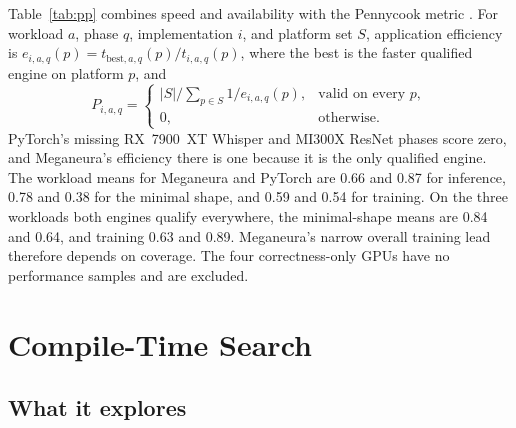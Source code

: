 \documentclass[conference]{IEEEtran}
\newcommand{\system}{Meganeura}
\begin{document}
\begin{table}[t]
\caption{Pennycook scores over the seven main platforms, strict contract.
M: \system{}, P: PyTorch.}
\label{tab:pp}
\centering
\footnotesize
\setlength{\tabcolsep}{4pt}

\end{table}

Table~\ref{tab:pp} combines speed and availability with the Pennycook metric
\cite{pennycook2016metric,pennycook2021revisiting}. For workload $a$, phase
$q$, implementation $i$, and platform set $S$, application efficiency is
$e_{i,a,q}(p)=t_{\mathrm{best},a,q}(p)/t_{i,a,q}(p)$, where the best is the
faster qualified engine on platform $p$, and
\begin{equation}
P_{i,a,q}=\begin{cases}
|S|\big/\sum_{p\in S}1/e_{i,a,q}(p),&\text{valid on every }p,\\
0,&\text{otherwise.}
\end{cases}
\end{equation}
PyTorch's missing RX~7900~XT Whisper and MI300X ResNet phases score zero,
and \system{}'s efficiency there is one because it is the only qualified
engine. The workload means for \system{} and PyTorch are 0.66 and 0.87 for
inference, 0.78 and 0.38 for the minimal shape, and 0.59 and 0.54 for
training. On the three workloads both engines qualify everywhere, the
minimal-shape means are 0.84 and 0.64, and training 0.63 and 0.89.
\system{}'s narrow overall training lead therefore depends on coverage.
The four correctness-only GPUs have no performance samples and are excluded.

\section{Compile-Time Search}
\label{sec:search}

\begin{table}[t]
\caption{Search in the 210 core native processes, both contracts. Trials
include baselines and chunk variants. Trunc.: sessions whose deadline ended
the program search; Graph $\ne0$: sessions that chose a graph other than the
extracted one; Invalid: numerical rejections; Scratch: trials stopped by the
kernel-probe scratch limit.}
\label{tab:search}
\centering\footnotesize
\setlength{\tabcolsep}{2.5pt}

\end{table}

\subsection{What it explores}
\end{document}
